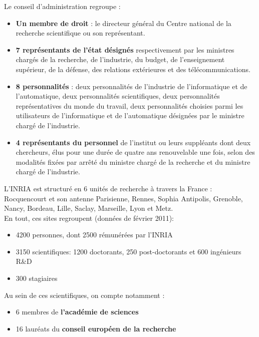 \documentclass[a4paper, 11pt]{report}
\begin{document}
    Le conseil d'administration regroupe :
    \begin{itemize}
      \item \textbf{Un membre de droit} : le directeur général du Centre national de
        la recherche scientifique ou son représentant.
      \item \textbf{7 représentants de l'état désignés} respectivement par les
        ministres chargés de la recherche, de l'industrie, du budget, de
        l'enseignement supérieur, de la défense, des relations extérieures et
        des télécommunications.
      \item \textbf{8 personnalités} : deux personnalités de l'industrie de
        l'informatique et de l'automatique, deux personnalités scientifiques,
        deux personnalités représentatives du monde du travail, deux
        personnalités choisies parmi les utilisateurs de l'informatique et de
        l'automatique désignées par le ministre chargé de l'industrie.
      \item \textbf{4 représentants du personnel} de l'institut ou leurs
        suppléants dont deux chercheurs, élus pour une durée de quatre ans
        renouvelable une fois, selon des modalités fixées par arrêté du
        ministre chargé de la recherche et du ministre chargé de l'industrie.
    \end{itemize}

    L'INRIA est structuré en 6 unités de recherche à travers la France :
    Rocquencourt et son antenne Parisienne, Rennes, Sophia Antipolis, Grenoble,
    Nancy, Bordeau, Lille, Saclay, Marseille, Lyon et Metz. \\

    En tout, ces sites regroupent (données de février 2011):
    \begin{itemize}
      \item 4200 personnes, dont 2500 rémunérées par l'INRIA
      \item 3150 scientifiques: 1200 doctorants, 250 post-doctorants et 600
        ingénieurs R\&D
      \item 300 stagiaires
    \end{itemize}
    Au sein de ces scientifiques, on compte notamment :
    \begin{itemize}
      \item 6 membres de \textbf{l'académie de sciences}
      \item 16 lauréats du \textbf{conseil européen de la recherche}
    \end{itemize}
\end{document}
